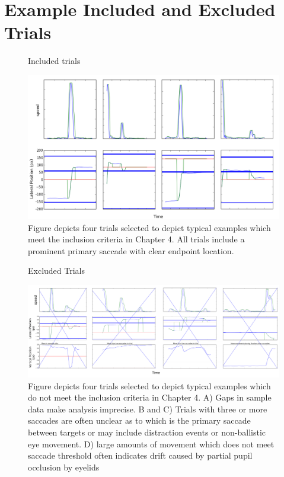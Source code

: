 \appendix
\chapter{Example Included and Excluded Trials}
\label{app}

\begin{figure}[p]
\centering
\begin{sffamily}
\large Included trials

\bigskip

\includegraphics[width=\textwidth]{appendix/accepted}
\end{sffamily}
\caption{Figure depicts four trials selected to depict typical
examples which meet the inclusion criteria in Chapter 4. All trials
include a prominent primary saccade with clear endpoint location.}
\end{figure}

\begin{figure}[p]
\centering
\begin{sffamily}
\large Excluded Trials

\bigskip

\includegraphics[width=\textwidth]{appendix/rejected}
\end{sffamily}
\caption{Figure depicts four trials selected to depict typical
examples which do not meet the inclusion criteria in Chapter 4. A) Gaps
in sample data make analysis imprecise. B and C) Trials with three or more saccades
are often unclear as to which is the primary saccade between targets or may include
distraction events or non-ballistic eye movement. 
D) large amounts of movement which does not meet saccade 
threshold often indicates drift caused by partial pupil occlusion by eyelids}
\end{figure}

